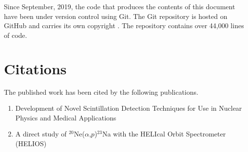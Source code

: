 Since September, 2019, the code that produces the contents of this document have been under version control using Git. The Git repository is hosted on GitHub and carries its own copyright \cite{Lighthall_thesis_2021}. The repository contains over 44,000 lines of code.

\section{Citations}
The published work has been cited by the following publications.
\begin{enumerate}
    \item Development of Novel Scintillation Detection Techniques for Use in Nuclear Physics and Medical Applications
    \item A direct study of $^{20}$Ne($\alpha$,$p$)$^{23}$Na with the HELIcal Orbit Spectrometer (HELIOS)
\end{enumerate}